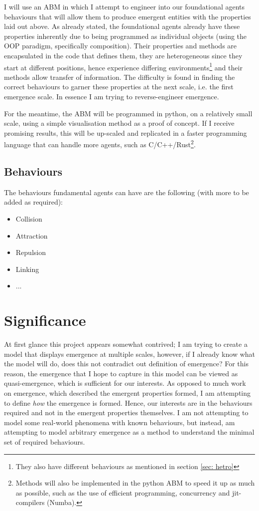 \documentclass{article}
\begin{document}
  I will use an ABM in which I attempt to engineer into our foundational agents behaviours that will allow them to produce emergent entities with the properties laid out above. As already stated, the foundational agents already have these properties inherently due to being programmed as individual objects (using the OOP paradigm, specifically composition). Their properties and methods are encapsulated in the code that defines them, they are heterogeneous since they start at different positions, hence experience differing environments\footnote{They also have different behaviours as mentioned in section \ref{sec: hetro}} and their methods allow transfer of information. The difficulty is found in finding the correct behaviours to garner these properties at the next scale, i.e. the first emergence scale. In essence I am trying to reverse-engineer emergence.

    For the meantime, the ABM will be programmed in python, on a relatively small scale, using a simple visualisation method as a proof of concept. If I receive promising results, this will be up-scaled and replicated in a faster programming language that can handle more agents, such as C/C++/Rust\footnote{Methods will also be implemented in the python ABM to speed it up as much as possible, such as the use of efficient programming, concurrency and jit-compilers (Numba).}. 

    \subsection{Behaviours}
      
      The behaviours fundamental agents can have are the following (with more to be added as required):

      \begin{itemize}
        \item Collision
        \item Attraction
        \item Repulsion
        \item Linking
        \item ...
      \end{itemize}


\section{Significance}

  At first glance this project appears somewhat contrived; I am trying to create a model that displays emergence at multiple scales, however, if I already know what the model will do, does this not contradict out definition of emergence? For this reason, the emergence that I hope to capture in this model can be viewed as quasi-emergence, which is sufficient for our interests. As opposed to much work on emergence, which described the emergent properties formed, I am attempting to define \textit{how} the emergence is formed. Hence, our interests are in the behaviours required and not in the emergent properties themselves. I am not attempting to model some real-world phenomena with known behaviours, but instead, am attempting to model arbitrary emergence as a method to understand the minimal set of required behaviours. 
\end{document}
